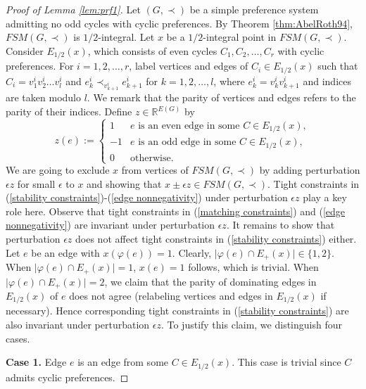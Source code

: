 \documentclass[11pt]{article}
\numberwithin{theorem}{section}
\begin{document}
\begin{proof}[Proof of Lemma \ref{lem:prf1}]
Let $(G,\prec)$ be a simple preference system admitting no odd cycles with cyclic preferences.
By Theorem \ref{thm:AbelRoth94}, $FSM(G,\prec)$ is $1/2$-integral.
Let $x$ be a $1/2$-integral point in $FSM(G, \prec)$.
Consider $E_{1/2}(x)$, which consists of even cycles $C_1,C_2,\ldots,C_r$ with cyclic preferences. For $i=1,2,\ldots,r$, label vertices and edges of $C_i\in E_{1/2}(x)$ such that $C_i=v^i_1v^i_2\ldots v^i_{l}$ and $e^i_k\prec_{v^i_{k+1}} e^i_{k+1}$ for $k=1,2,\ldots,l$, where $e^i_k=v^i_{k}v^i_{k+1}$ and indices are taken modulo $l$. 
We remark that the parity of vertices and edges refers to the parity of their indices. Define $z\in \mathbb{R}^{E(G)}$ by
\begin{equation*}
z(e):=
\begin{cases}
1 & e\text{ is an even edge in some }C \in E_{1/2}(x),\\
-1 & e\text{ is an odd edge in some }C \in E_{1/2}(x),\\
0 & \text{otherwise}.
\end{cases}
\end{equation*}
We are going to exclude $x$ from vertices of $FSM(G, \prec)$ by adding perturbation $\epsilon z$ for small $\epsilon$ to $x$ and showing that $x\pm\epsilon z\in FSM(G,\prec)$. 
Tight constraints in (\ref{stability constraints})-(\ref{edge nonnegativity}) under perturbation $\epsilon z$ play a key role here. Observe that tight constraints in (\ref{matching constraints}) and (\ref{edge nonnegativity}) are invariant under perturbation $\epsilon z$. It remains to show that perturbation $\epsilon z$ does not affect tight constraints in (\ref{stability constraints}) either. Let $e$ be an edge with $x(\varphi(e))=1$. Clearly, $\lvert \varphi(e)\cap E_+(x)\rvert \in\{1,2\}$. When $\lvert \varphi(e)\cap E_+(x)\rvert=1$, $x(e)=1$ follows, which is trivial. When $\lvert \varphi(e)\cap E_+(x)\rvert =2$, we claim that the parity of dominating edges in $E_{1/2}(x)$ of $e$ does not agree (relabeling vertices and edges in $E_{1/2}(x)$ if necessary).
Hence corresponding tight constraints in (\ref{stability constraints}) are also invariant under perturbation $\epsilon z$.
To justify this claim, we distinguish four cases.

\textbf{Case 1.} Edge $e$ is an edge from some $C\in E_{1/2}(x)$. This case is trivial since $C$ admits cyclic preferences.


\end{proof}
\end{document}
